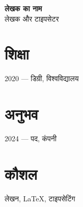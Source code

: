 \documentclass[11pt]{article}
\begin{document}
{\Large\bfseries लेखक का नाम}\\[4pt]
{\large लेखक और टाइपसेटर}

\vspace{8pt}

\section*{शिक्षा}
2020 — डिग्री, विश्वविद्यालय

\section*{अनुभव}
2024 — पद, कंपनी

\section*{कौशल}
लेखन, LaTeX, टाइपसेटिंग
\end{document}
